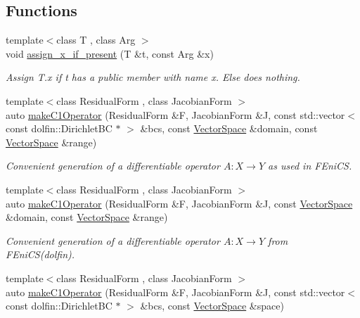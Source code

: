 \subsection*{Functions}
\begin{DoxyCompactItemize}
\item 
\hypertarget{namespaceSpacy_1_1FEniCS_a8b026331ea4b807e97cc64cb765e6a73}{{\footnotesize template$<$class T , class Arg $>$ }\\void \hyperlink{namespaceSpacy_1_1FEniCS_a8b026331ea4b807e97cc64cb765e6a73}{assign\-\_\-x\-\_\-if\-\_\-present} (T \&t, const Arg \&x)}\label{namespaceSpacy_1_1FEniCS_a8b026331ea4b807e97cc64cb765e6a73}

\begin{DoxyCompactList}\small\item\em Assign T.\-x if t has a public member with name x. Else does nothing. \end{DoxyCompactList}\item 
{\footnotesize template$<$class Residual\-Form , class Jacobian\-Form $>$ }\\auto \hyperlink{namespaceSpacy_1_1FEniCS_a5ff124eb62c7d5b69a5ab4aa196a2453}{make\-C1\-Operator} (Residual\-Form \&F, Jacobian\-Form \&J, const std\-::vector$<$ const dolfin\-::\-Dirichlet\-B\-C $\ast$ $>$ \&bcs, const \hyperlink{classSpacy_1_1VectorSpace}{Vector\-Space} \&domain, const \hyperlink{classSpacy_1_1VectorSpace}{Vector\-Space} \&range)
\begin{DoxyCompactList}\small\item\em Convenient generation of a differentiable operator $A: X\rightarrow Y$ as used in F\-Eni\-C\-S. \end{DoxyCompactList}\item 
{\footnotesize template$<$class Residual\-Form , class Jacobian\-Form $>$ }\\auto \hyperlink{namespaceSpacy_1_1FEniCS_a8b625ee36b2bee78a517d91031572c81}{make\-C1\-Operator} (Residual\-Form \&F, Jacobian\-Form \&J, const \hyperlink{classSpacy_1_1VectorSpace}{Vector\-Space} \&domain, const \hyperlink{classSpacy_1_1VectorSpace}{Vector\-Space} \&range)
\begin{DoxyCompactList}\small\item\em Convenient generation of a differentiable operator $A: X\rightarrow Y$ from F\-Eni\-C\-S(dolfin). \end{DoxyCompactList}\item 
{\footnotesize template$<$class Residual\-Form , class Jacobian\-Form $>$ }\\auto \hyperlink{namespaceSpacy_1_1FEniCS_ac2ffc6f5956faffe26cc9e0ef59209c3}{make\-C1\-Operator} (Residual\-Form \&F, Jacobian\-Form \&J, const std\-::vector$<$ const dolfin\-::\-Dirichlet\-B\-C $\ast$ $>$ \&bcs, const \hyperlink{classSpacy_1_1VectorSpace}{Vector\-Space} \&space)

\end{DoxyCompactItemize}
